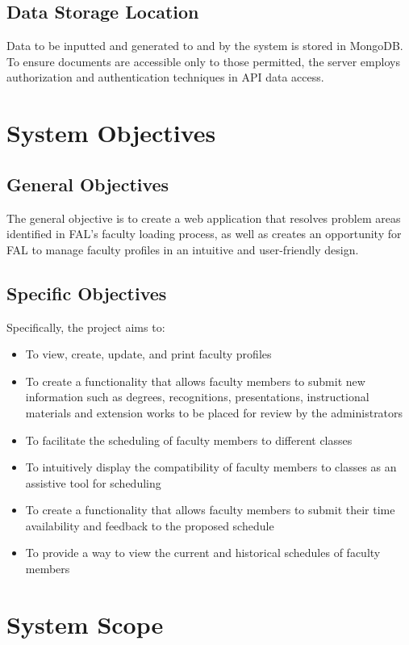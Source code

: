 \subsection{Data Storage Location}
Data to be inputted and generated to and by the system is stored in MongoDB. To ensure documents are accessible only to those permitted, the server employs authorization and authentication techniques in API data access.

\section{System Objectives}

    \subsection{General Objectives}
    The general objective is to create a web application that resolves problem areas identified in FAL's faculty loading process, as well as creates an opportunity for FAL to manage faculty profiles in an intuitive and user-friendly design.
    
    \subsection{Specific Objectives}
    Specifically, the project aims to:
    
    \begin{itemize}
        \item To view, create, update, and print faculty profiles
        \item To create a functionality that allows faculty members to submit new information such as degrees, recognitions, presentations, instructional materials and extension works to be placed for review by the administrators
        \item To facilitate the scheduling of faculty members to different classes
        \item To intuitively display the compatibility of faculty members to classes as an assistive tool for scheduling
        \item To create a functionality that allows faculty members to submit their time availability and feedback to the proposed schedule
        \item To provide a way to view the current and historical schedules of faculty members
    \end{itemize}

\section{System Scope}

